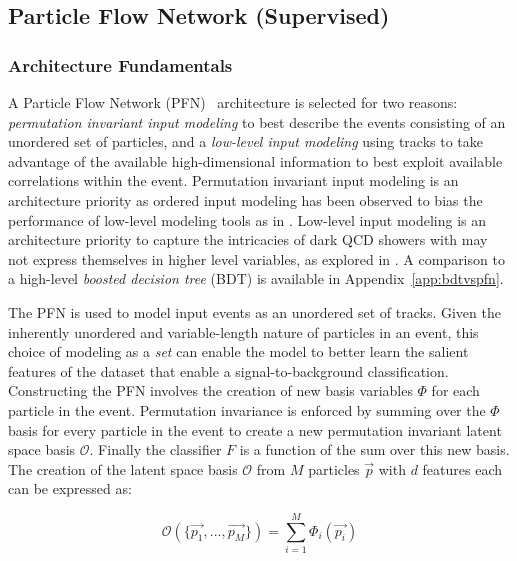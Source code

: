 \subsection{Particle Flow Network (Supervised)}
\label{subsec:supervised}
\subsubsection{Architecture Fundamentals}

A Particle Flow Network (PFN)~\cite{pfn} architecture is selected for two reasons: \textit{permutation invariant input modeling} to best describe the events consisting of an unordered set of particles, and a \textit{low-level input modeling} using tracks to take advantage of the available high-dimensional information to best exploit available correlations within the event. Permutation invariant input modeling is an architecture priority as ordered input modeling has been observed to bias the performance of low-level modeling tools as in \cite{vrnn}. Low-level input modeling is an architecture priority to capture the intricacies of dark QCD showers with may not express themselves in higher level variables, as explored in \cite{darkqcd}. A comparison to a high-level \textit{boosted decision tree} (BDT) is available in Appendix~\ref{app:bdtvspfn}.

The PFN is used to model input events as an unordered set of tracks. Given the inherently unordered and variable-length nature of particles in an event, this choice of modeling as a \textit{set} can enable the model to better learn the salient features of the dataset that enable a signal-to-background classification. Constructing the PFN involves the creation of new basis variables $\mathcal{\Phi}$ for each particle in the event. Permutation invariance is enforced by summing over the $\mathcal{\Phi}$ basis for every particle in the event to create a new permutation invariant latent space basis $\mathcal{O}$. Finally the classifier $F$ is a function of the sum over this new basis. The creation of the latent space basis $\mathcal{O}$ from $M$ particles $\vec{p}$ with $d$ features each can be expressed as:

\begin{equation}
  \mathcal{O}(\{\vec{p_1},...,\vec{p_M}\}) = \sum_{i=1}^M \Phi_i(\vec{p_i})
  \label{eq:pfn}
\end{equation}

